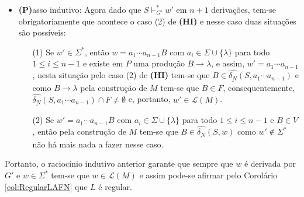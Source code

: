 \begin{prova}
\begin{itemize}
		\item \textbf{(P)}asso indutivo: Agora dado que $S \vdash^*_{G'} w'$ em $n+1$ derivações, tem-se obrigatoriamente que acontece o caso (2) de \textbf{(HI)} e nesse caso duas situações são possíveis:
		\begin{itemize}
			\item[(1)] Se $w' \in \Sigma^*$, então $w = a_1\cdots a_{n-1}B$ com $a_i \in \Sigma \cup \{\lambda\}$ para todo $1 \leq i \leq n-1$ e existe em $P$ uma produção $B \rightarrow \lambda$, e assim, $w' = a_1\cdots a_{n-1}$, nesta situação pelo caso (2) de \textbf{(HI)} tem-se que $B \in \widehat{\underline{\delta_N}}(S, a_1\cdots a_{n-1})$ e como $B \rightarrow \lambda$ pela construção de $M$ tem-se que $B \in F$, consequentemente, $\widehat{\underline{\delta_N}}(S, a_1\cdots a_{n-1}) \cap F \neq \emptyset$ e, portanto, $w' \in \mathcal{L}(M)$.
			\item[(2)] Se $w' = a_1\cdots a_{n-1}B$ com $a_i \in \Sigma \cup \{\lambda\}$ para todo $1 \leq i \leq n-1$ e $B \in V$, então pela construção de $M$ tem-se que $B \in \widehat{\underline{\delta_N}}(S, w)$ como $w' \notin \Sigma^*$ não há mais nada a fazer nesse caso.
		\end{itemize}
	\end{itemize}
	Portanto, o raciocínio indutivo anterior garante que sempre que  $w$ é derivada por $G'$ e $w \in \Sigma^*$ tem-se que $w \in \mathcal{L}(M)$ e assim pode-se afirmar pelo Corolário \ref{col:RegularLAFN} que $L$ é regular. 
	

\end{prova}
